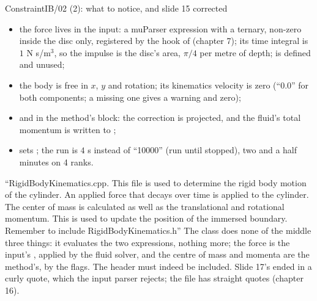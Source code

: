 \documentclass[aspectratio=169,11pt]{beamer}
\begin{document}
\begin{frame}{ConstraintIB/02 (2): what to notice, and slide 15 corrected}
\label{fr:ex02c}
\footnotesize
\begin{itemize}
  \item the force lives in the input: a muParser expression with a ternary, non-zero inside the disc only, registered by the  hook of  (chapter 7); its time integral is $1$ N s/m$^3$, so the impulse is the disc's area, $\pi/4$ per metre of depth;  is defined and unused;
  \item the body is free in $x$, $y$ and rotation; its kinematics velocity is zero (``0.0'' for both components; a missing one gives a warning and zero);
  \item {} and  in the method's block: the correction is projected, and the fluid's total momentum is written to ;
  \item {} sets ; the run is $4$ s instead of ``10000'' (run until stopped), two and a half minutes on 4 ranks.
\end{itemize}
\vspace{1mm}

\scriptsize {} ``RigidBodyKinematics.cpp. This file is used to determine the rigid body motion of the cylinder. An applied force that decays over time is applied to the cylinder. The center of mass is calculated as well as the translational and rotational momentum. This is used to update the position of the immersed boundary. Remember to include RigidBodyKinematics.h'' The class does none of the middle three things: it evaluates the two  expressions, nothing more; the force is the input's , applied by the fluid solver, and the centre of mass and momenta are the method's, by the  flags. The header must indeed be included. Slide 17's  ended in a curly quote, which the input parser rejects; the file has straight quotes (chapter 16).
\end{frame}
\end{document}
